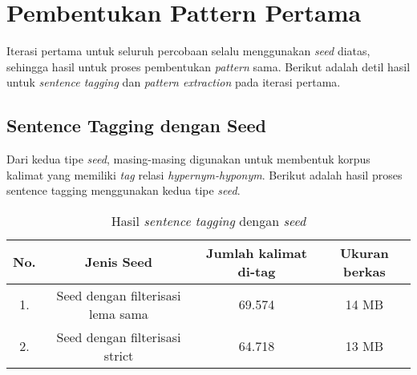 \section{Pembentukan Pattern Pertama}
Iterasi pertama untuk seluruh percobaan selalu menggunakan \textit{seed} diatas, sehingga hasil untuk proses pembentukan \textit{pattern} sama. Berikut adalah detil hasil untuk \textit{sentence tagging} dan \textit{pattern extraction} pada iterasi pertama.

\subsection{Sentence Tagging dengan Seed}
Dari kedua tipe \textit{seed}, masing-masing digunakan untuk membentuk korpus kalimat yang memiliki \textit{tag} relasi \textit{hypernym-hyponym}. Berikut adalah hasil proses sentence tagging menggunakan kedua tipe \textit{seed}.
\begin{table}
  \centering
  \caption{Hasil \textit{sentence tagging} dengan \textit{seed}}
  \label{table:sentencetagging1}
  \begin{tabular}{|c|c|c|c|}
    \hline
      No. & Jenis Seed                        & Jumlah kalimat di-tag & Ukuran berkas \\ \hline
      1.  & Seed dengan filterisasi lema sama & 69.574                & 14 MB         \\ \hline
      2.  & Seed dengan filterisasi strict    & 64.718                & 13 MB         \\ \hline
  \end{tabular}
\end{table}

